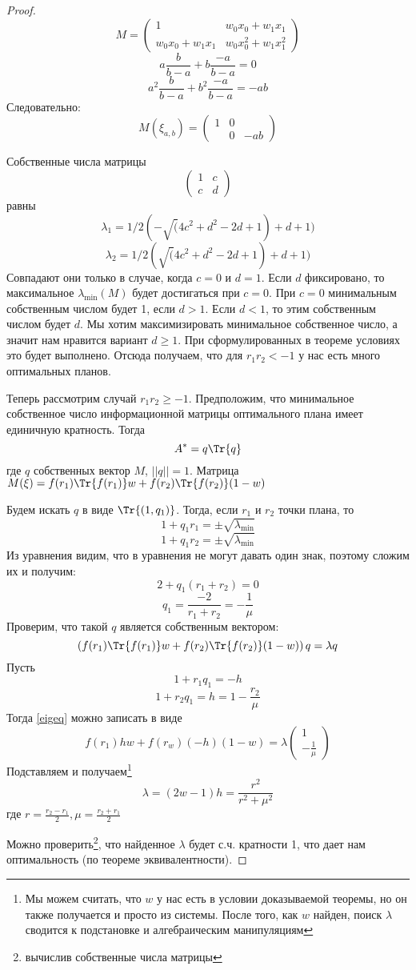 \begin{proof}
$$ M = \begin{pmatrix} 1 & w_0 x_0 + w_1 x_1 \\ w_0 x_0 + w_1 x_1 & w_0 x_0^2 + w_1 x_1^2 \end{pmatrix}$$
$$ a \frac{b}{b-a} + b \frac{-a}{b-a} = 0$$
$$ a^2 \frac{b}{b-a} + b^2 \frac{-a}{b-a} = -ab$$
Следовательно: 
$$M(\xi_{a,b}) = \begin{pmatrix} 1 & 0 \\ & 0 & -ab \end{pmatrix}$$

Собственные числа матрицы
$$\begin{pmatrix} 1 & c \\ c & d \end{pmatrix}$$ 
равны
$$\lambda_1 = 1/2 (-\sqrt(4 c^2+d^2-2 d+1)+d+1)$$
$$ \lambda_2 = 1/2 (\sqrt(4 c^2+d^2-2 d+1)+d+1)$$
Совпадают они только в случае, когда $c=0$ и $d=1$. 
Если $d$ фиксировано, то максимальное $\lambda_{\min}(M)$ будет достигаться при $c = 0$. При $c=0$ минимальным собственным числом будет 1, если $d>1$. Если $d< 1$, то этим собственным числом будет $d$. Мы хотим максимизировать минимальное собственное число, а значит нам нравится вариант $d\geq 1$. При сформулированных в теореме условиях это будет выполнено. Отсюда получаем, что для $r_1r_2 < -1$ у нас есть много оптимальных планов.

Теперь рассмотрим случай $r_1r_2 \geq -1$. Предположим, что минимальное собственное число информационной матрицы оптимального плана имеет единичную кратность. Тогда
$$A^{*} = q\Tr{q}$$
где  $q$ собственных вектор $M$, $||q|| = 1$.
Матрица $M(\xi) = f(r_1)\Tr{f(r_1)}w + f(r_2)\Tr{f(r_2)}(1-w)$ 

Будем искать $q$ в виде $\Tr{(1, q_1)}$. Тогда, если $r_1$ и $r_2$ точки плана, то
$$ 1 + q_1r_1 = ±\sqrt{\lambda_{\min}}$$
$$ 1 + q_1r_2 = ±\sqrt{\lambda_{\min}}$$
Из уравнения видим, что в уравнения не могут давать один знак, поэтому сложим их и получим:
$$2 + q_1(r_1+r_2)=0$$
$$q_1 = \frac{-2}{r_1+r_2} = -\frac{1}{\mu}$$
Проверим, что такой $q$ является собственным вектором:
\begin{equation}
\label{eigeq}
\left(f(r_1)\Tr{f(r_1)}w + f(r_2)\Tr{f(r_2)}(1-w)\right)q = \lambda q
\end{equation}
Пусть 
$$ 1 + r_1 q_1 = -h$$
$$ 1 + r_2 q_1 = h = 1 - \frac{r_2}{\mu}$$ 
Тогда \eqref{eigeq} можно записать в виде
$$ f(r_1) h w + f(r_w)(-h)(1-w) = \lambda \begin{pmatrix} 1 \\ -\frac{1}{\mu} \end{pmatrix}$$
Подставляем и получаем\footnote{Мы можем считать, что $w$ у нас есть в условии доказываемой теоремы, но он также получается и просто из системы. После того, как $w$ найден, поиск $\lambda$ сводится к подстановке и алгебраическим манипуляциям}
$$ \lambda = (2w - 1)h = \frac{r^2}{r^2 + \mu ^2}$$ 
где $r = \frac{r_2 - r_1}{2}, \mu = \frac{r_2+r_1}{2}$

Можно проверить\footnote{вычислив собственные числа матрицы}, что найденное $\lambda$ будет с.ч. кратности 1, что дает нам оптимальность (по теореме эквивалентности).
 \end{proof}

